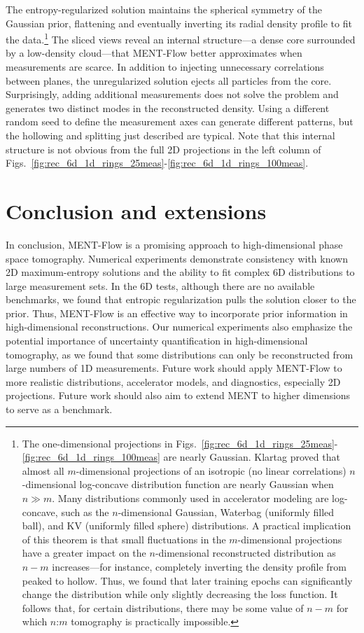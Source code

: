 \documentclass[%
    reprint,
    twocolumn,
    nofootinbib,
    amsmath,
    amssymb,
    aps,
    prstab,
]{revtex4-2}
\begin{document}
The entropy-regularized solution maintains the spherical symmetry of the Gaussian prior, flattening and eventually inverting its radial density profile to fit the data.\footnote{The one-dimensional projections in Figs.~\ref{fig:rec_6d_1d_rings_25meas}-\ref{fig:rec_6d_1d_rings_100meas} are nearly Gaussian. Klartag \cite{Klartag_2007} proved that almost all $m$-dimensional projections of an isotropic (no linear correlations) $n$-dimensional log-concave distribution function are nearly Gaussian when $n \gg m$. Many distributions commonly used in accelerator modeling are log-concave, such as the $n$-dimensional Gaussian, Waterbag (uniformly filled ball), and KV (uniformly filled sphere) distributions. A practical implication of this theorem is that small fluctuations in the $m$-dimensional projections have a greater impact on the $n$-dimensional reconstructed distribution as $n - m$ increases---for instance, completely inverting the density profile from peaked to hollow. Thus, we found that later training epochs can significantly change the distribution while only slightly decreasing the loss function. It follows that, for certain distributions, there may be some value of $n - m$ for which $n$:$m$ tomography is practically impossible.} The sliced views reveal an internal structure---a dense core surrounded by a low-density cloud---that MENT-Flow better approximates when measurements are scarce. In addition to injecting unnecessary correlations between planes, the unregularized solution ejects all particles from the core. Surprisingly, adding additional measurements does not solve the problem and generates two distinct modes in the reconstructed density. Using a different random seed to define the measurement axes can generate different patterns, but the hollowing and splitting just described are typical. Note that this internal structure is not obvious from the full 2D projections in the left column of Figs.~\ref{fig:rec_6d_1d_rings_25meas}-\ref{fig:rec_6d_1d_rings_100meas}.




\section{Conclusion and extensions} \label{sec:conclusion}

In conclusion, MENT-Flow is a promising approach to high-dimensional phase space tomography. Numerical experiments demonstrate consistency with known 2D maximum-entropy solutions and the ability to fit complex 6D distributions to large measurement sets. In the 6D tests, although there are no available benchmarks, we found that entropic regularization pulls the solution closer to the prior. Thus, MENT-Flow is an effective way to incorporate prior information in high-dimensional reconstructions. Our numerical experiments also emphasize the potential importance of uncertainty quantification in high-dimensional tomography, as we found that some distributions can only be reconstructed from large numbers of 1D measurements. Future work should apply MENT-Flow to more realistic distributions, accelerator models, and diagnostics, especially 2D projections. Future work should also aim to extend MENT to higher dimensions to serve as a benchmark.
\end{document}
